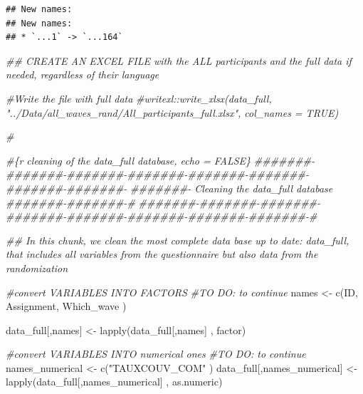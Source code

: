 \documentclass[
]{article}
\newenvironment{Shaded}{}{}
\newcommand{\CommentTok}[1]{\textcolor[rgb]{0.38,0.63,0.69}{\textit{#1}}}
\newcommand{\DocumentationTok}[1]{\textcolor[rgb]{0.73,0.13,0.13}{\textit{#1}}}
\newcommand{\FunctionTok}[1]{\textcolor[rgb]{0.02,0.16,0.49}{#1}}
\newcommand{\NormalTok}[1]{#1}
\newcommand{\OtherTok}[1]{\textcolor[rgb]{0.00,0.44,0.13}{#1}}
\newcommand{\StringTok}[1]{\textcolor[rgb]{0.25,0.44,0.63}{#1}}
\begin{document}
\begin{verbatim}
## New names:
## New names:
## * `...1` -> `...164`
\end{verbatim}

\begin{Shaded}
\begin{Highlighting}[]
\DocumentationTok{\#\# CREATE AN EXCEL FILE with the ALL participants and the full data if needed, regardless of their language}


\CommentTok{\#Write the file with full data}
\CommentTok{\#writexl::write\_xlsx(data\_full, "../Data/all\_waves\_rand/All\_participants\_full.xlsx", col\_names = TRUE)}


\CommentTok{\#\textasciigrave{}\textasciigrave{}\textasciigrave{}}

\CommentTok{\#\textasciigrave{}\textasciigrave{}\textasciigrave{}\{r cleaning of the data\_full database, echo = FALSE\}}
\DocumentationTok{\#\#\#\#\#\#\#{-}\#\#\#\#\#\#\#{-}\#\#\#\#\#\#\#{-}\#\#\#\#\#\#\#{-}\#\#\#\#\#\#\#{-}\#\#\#\#\#\#\#{-}\#\#\#\#\#\#\#{-}\#\#\#\#\#\#\#{-}}
\DocumentationTok{\#\#\#\#\#\#\#{-} Cleaning the data\_full database \#\#\#\#\#\#\#{-}\#\#\#\#\#\#\#{-}\#}
\DocumentationTok{\#\#\#\#\#\#\#{-}\#\#\#\#\#\#\#{-}\#\#\#\#\#\#\#{-}\#\#\#\#\#\#\#{-}\#\#\#\#\#\#\#{-}\#\#\#\#\#\#\#{-}\#\#\#\#\#\#\#{-}\#\#\#\#\#\#\#{-}\#}

\DocumentationTok{\#\# In this chunk, we clean the most complete data base up to date: data\_full, that includes all variables from the questionnaire but also data from the randomization}

\CommentTok{\#convert VARIABLES INTO FACTORS}
\CommentTok{\#TO DO: to continue}
\NormalTok{names }\OtherTok{\textless{}{-}} \FunctionTok{c}\NormalTok{(}\StringTok{\textquotesingle{}ID\textquotesingle{}}\NormalTok{, }\StringTok{\textquotesingle{}Assignment\textquotesingle{}}\NormalTok{, }\StringTok{\textquotesingle{}Which\_wave\textquotesingle{}}
\NormalTok{)}

\NormalTok{data\_full[,names] }\OtherTok{\textless{}{-}} \FunctionTok{lapply}\NormalTok{(data\_full[,names] , factor)}

\CommentTok{\#convert VARIABLES INTO numerical ones}
\CommentTok{\#TO DO: to continue}
\NormalTok{names\_numerical }\OtherTok{\textless{}{-}} \FunctionTok{c}\NormalTok{(}\StringTok{"TAUXCOUV\_COM"}\NormalTok{ )}
\NormalTok{data\_full[,names\_numerical] }\OtherTok{\textless{}{-}} \FunctionTok{lapply}\NormalTok{(data\_full[,names\_numerical] , as.numeric)}
\end{Highlighting}
\end{Shaded}
\end{document}
